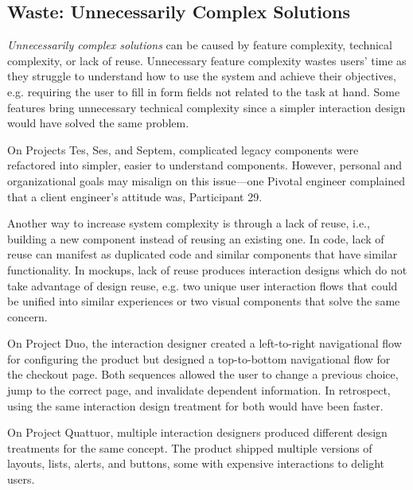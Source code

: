 \subsection{Waste: Unnecessarily Complex Solutions}
\textit{Unnecessarily complex solutions} can be caused by feature complexity, technical complexity, or lack of reuse. Unnecessary feature complexity wastes users' time as they struggle to understand how to use the system and achieve their objectives, e.g. requiring the user to fill in form fields not related to the task at hand. Some features bring unnecessary technical complexity since a simpler interaction design would have solved the same problem. %

On Projects Tes, Ses, and Septem, complicated legacy components were refactored into simpler, easier to understand components. However, personal and organizational goals may misalign on this issue---one Pivotal engineer complained that a client engineer's attitude was,  \textemdash Participant 29.

Another way to increase system complexity is through a lack of reuse, i.e., building a new component instead of reusing an existing one. In code, lack of reuse can manifest as duplicated code and similar components that have similar functionality. In mockups, lack of reuse produces  interaction designs which do not take advantage of design reuse, e.g. two unique user interaction flows that could be unified into similar experiences or two visual components that solve the same concern.

On Project Duo, the interaction designer created a left-to-right navigational flow for configuring the product but designed a top-to-bottom navigational flow for the checkout page. Both sequences allowed the user to change a previous choice, jump to the correct page, and invalidate dependent information. In retrospect, using the same interaction design treatment for both would have been faster. 

On Project Quattuor, multiple interaction designers produced different design treatments for the same concept. The product shipped multiple versions of layouts, lists, alerts, and buttons, some with expensive interactions to delight users. 

